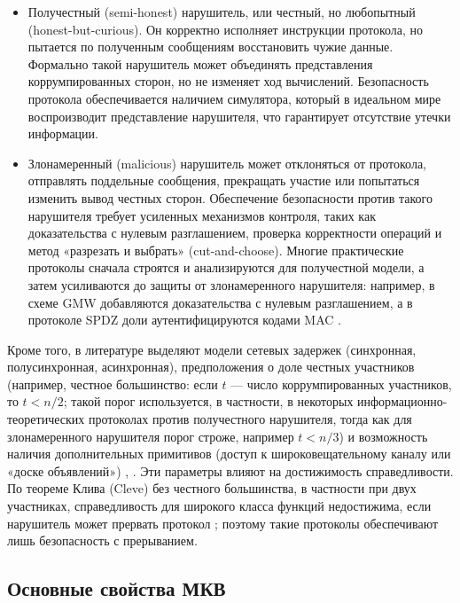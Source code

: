 \begin{itemize}
\item Получестный (semi-\allowbreak honest) нарушитель, или честный, но любопытный (honest-but-curious). Он корректно исполняет инструкции протокола, но пытается по полученным сообщениям восстановить чужие данные. Формально такой нарушитель может объединять представления коррумпированных сторон, но не изменяет ход вычислений. Безопасность протокола обеспечивается наличием симулятора, который в идеальном мире воспроизводит представление нарушителя, что гарантирует отсутствие утечки информации.

\item Злонамеренный (malicious) нарушитель может отклоняться от протокола, отправлять поддельные сообщения, прекращать участие или попытаться изменить вывод честных сторон. Обеспечение безопасности против такого нарушителя требует усиленных механизмов контроля, таких как доказательства с нулевым разглашением, проверка корректности операций и метод «разрезать и выбрать» (cut-and-choose). Многие практические протоколы сначала строятся и анализируются для получестной модели, а затем усиливаются до защиты от злонамеренного нарушителя: например, в схеме GMW добавляются доказательства с нулевым разглашением, а в протоколе SPDZ доли аутентифицируются кодами MAC \cite{06}.
\end{itemize}

Кроме того, в литературе выделяют модели сетевых задержек (синхронная, полусинхронная, асинхронная), предположения о доле честных участников (например, честное большинство: если \(t\) --- число коррумпированных участников, то \(t<n/2\); такой порог используется, в частности, в некоторых информационно-\allowbreak теоретических протоколах против получестного нарушителя, тогда как для злонамеренного нарушителя порог строже, например \(t<n/3\)) и возможность наличия дополнительных примитивов (доступ к широковещательному каналу или «доске объявлений») \cite{06}, \cite{08}. Эти параметры влияют на достижимость справедливости. По теореме Клива (Cleve) без честного большинства, в частности при двух участниках, справедливость для широкого класса функций недостижима, если нарушитель может прервать протокол \cite{08}\cite{24}; поэтому такие протоколы обеспечивают лишь безопасность с прерыванием.

\subsection{Основные свойства МКВ}

